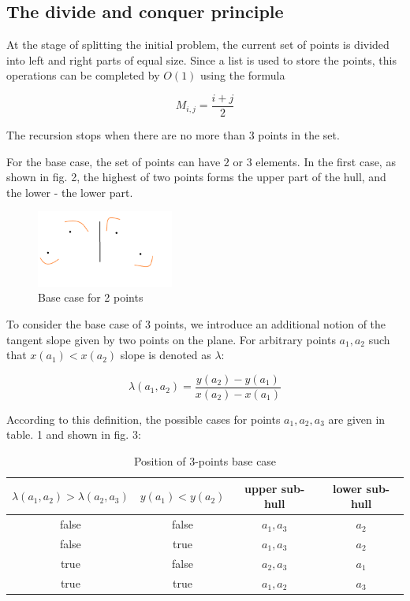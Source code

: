 \documentclass[conference]{IEEEtran}
\theoremstyle{plane}
\begin{document}
\subsection{The divide and conquer principle}

At the stage of splitting the initial problem, the current set of points is divided into left and right parts of equal size. Since a list is used to store the points, this operations can be completed by $O(1)$ using the formula

\begin{equation}
M_{i,j}=\frac{i+j}{2}
\end{equation}

The recursion stops when there are no more than $3$ points in the set.

For the base case, the set of points can have $2$ or $3$ elements. In the first case, as shown in fig. 2, the highest of two points forms the upper part of the hull, and the lower - the lower part.

\begin{figure}[htbp]
	\centerline{\includegraphics[width=0.4\textwidth, height=0.2\textheight]{base_case_2}}
	\caption{Base case for 2 points}
	\label{base_case_2}
\end{figure}

To consider the base case of $3$ points, we introduce an additional notion of the tangent slope given by two points on the plane. For arbitrary points $a_1, a_2$ such that $x(a_1)<x(a_2)$ slope is denoted as $\lambda$:

\begin{equation}
\lambda(a_1, a_2)=\frac{y(a_2)-y(a_1)}{x(a_2)-x(a_1)}
\end{equation}

According to this definition, the possible cases for points $a_1,a_2,a_3$ are given in table. 1 and shown in fig. 3:

\begin{table}[htbp]
	\caption{Position of 3-points base case}
	\begin{center}
		\begin{tabular}{|c|c|c|c|}
			\hline
			\textbf{$\lambda(a_1, a_2) > \lambda(a_2, a_3)$} & \textbf{$y(a_1) < y(a_2)$} & upper sub-hull & lower sub-hull \\
			\hline
			false & false & $a_1, a_3$ & $a_2$ \\
			\hline
			false & true & $a_1, a_3$ & $a_2$ \\
			\hline
			true & false & $a_2, a_3$ & $a_1$ \\
			\hline
			true & true & $a_1, a_2$ & $a_3$ \\
			\hline
		\end{tabular} 
	\end{center}
\end{table} 
\end{document}
